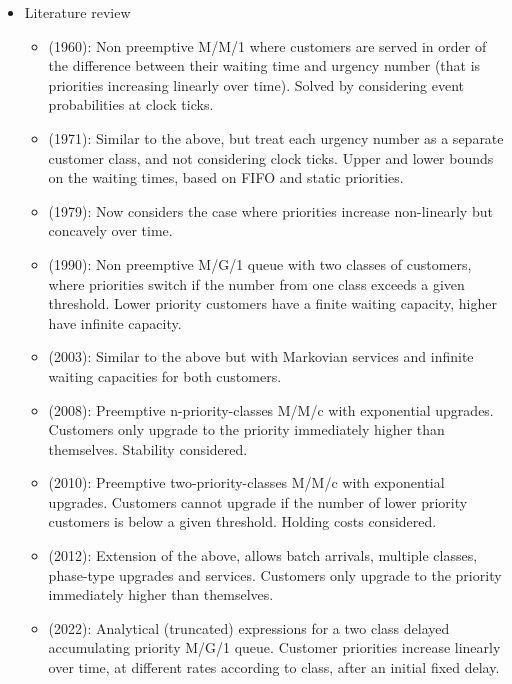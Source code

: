 \documentclass{article}
\begin{document}
\begin{itemize}
    \item Literature review
        \begin{itemize}
          \item \cite{jackson60} (1960): Non preemptive M/M/1 where customers
              are served in order of the difference between their waiting time
                and urgency number (that is priorities increasing linearly over
                time). Solved by considering event probabilities at clock ticks.
          \item \cite{holtzman71} (1971): Similar to the above, but treat each
              urgency number as a separate customer class, and not considering
                clock ticks. Upper and lower bounds on the waiting times, based
                on FIFO and static priorities.
          \item \cite{netterman79} (1979): Now considers the case where
              priorities increase non-linearly but concavely over time.
          \item \cite{fratini90} (1990): Non preemptive M/G/1 queue with two
              classes of customers, where priorities switch if the number from
                one class exceeds a given threshold. Lower priority customers
                have a finite waiting capacity, higher have infinite capacity.
          \item \cite{knessl03} (2003): Similar to the above but with Markovian
              services and infinite waiting capacities for both customers.
          \item \cite{xie08} (2008): Preemptive n-priority-classes M/M/c with
              exponential upgrades. Customers only upgrade to the priority
                immediately higher than themselves. Stability considered.
          \item \cite{down10} (2010): Preemptive two-priority-classes M/M/c with
              exponential upgrades. Customers cannot upgrade if the number of
                lower priority customers is below a given threshold. Holding
                costs considered.
          \item \cite{he12} (2012): Extension of the above, allows batch
              arrivals, multiple classes, phase-type upgrades and services.
                Customers only upgrade to the priority immediately higher than
                themselves.
          \item \cite{bilodeau22} (2022): Analytical (truncated) expressions for
              a two class delayed accumulating priority M/G/1 queue. Customer
                priorities increase linearly over time, at different rates
                according to class, after an initial fixed delay.
        \end{itemize}

\end{itemize}
\end{document}

